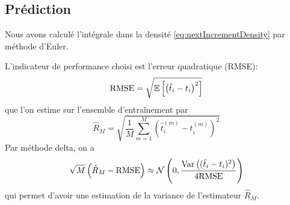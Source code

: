 \documentclass[../main.tex]{subfiles}
\begin{document}
\subsection{Prédiction}

Nous avons calculé l'intégrale dans la densité \eqref{eq:nextIncrementDensity} par méthode d'Euler.

L'indicateur de performance choisi est l'erreur quadratique (RMSE):
\begin{equation}\label{eq:rmse}
	\mathrm{RMSE} = \sqrt{\mathbb{E}\left[{\left(\hat{t}_i - t_i\right)}^2\right]}
\end{equation}
que l'on estime sur l'ensemble d'entraînement par
\[
	\hat{R}_M = \sqrt{\frac{1}{M}\sum_{m=1}^M
		\left(\hat{t}_i^{(m)} - t_i^{(m)}\right)^2
	}
\]
Par méthode delta, on a
\[
	\sqrt{M}\left(\hat{R}_M - \mathrm{RMSE}\right)
	\approx \mathcal{N}\left(0, \frac{
		\mathrm{Var}\left((\hat{t}_i - t_i)^2\right)}{4 \mathrm{RMSE}}
	\right)
\]
qui permet d'avoir une estimation de la variance de l'estimateur $\hat{R}_M$.
\end{document}

